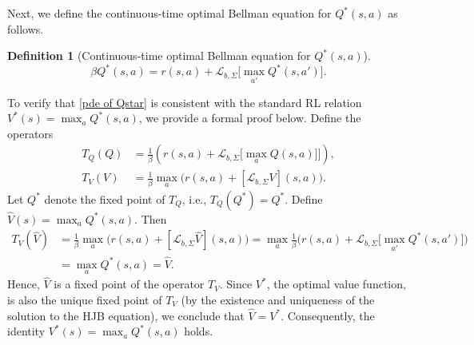 \documentclass[12pt]{article}
\newtheorem{definition}{Definition}
\def\mL{\mathcal{L}_{b,\Sigma}}
\def\l{\left}
\def\r{\right}
\begin{document}
Next, we define the continuous-time optimal Bellman equation for $Q^*(s,a)$ as follows.
\begin{definition}[Continuous-time optimal Bellman equation for $Q^*(s,a)$]\label{def of Q-pde}
\begin{equation}\label{pde of Qstar}
    \beta Q^*(s,a) = r(s,a) + \mL \big[\max_{a'} Q^*(s,a')\big] .
\end{equation}
\end{definition}

To verify that \eqref{pde of Qstar} is consistent with the standard RL relation $V^*(s) = \max_{a} Q^*(s,a)$, we provide a formal proof below.
Define the operators
\begin{align}\label{operator-Q}
T_Q(Q) &=\frac{1}{\beta}\l( r(s,a) + \mL \big[\max_{a} Q(s,a)\big] \big]\r),\\
T_V(V) &= \frac1\beta\max_{a} \Big(r(s,a) + [\mL V](s,a) \Big).
\end{align}
Let $Q^*$ denote the fixed point of $T_Q$, i.e., $T_Q(Q^*) = Q^*$. Define $\hat{V}(s) = \max_{a} Q^*(s,a)$. Then
\begin{align*}
    T_V(\hat{V}) 
    &= \frac{1}{\beta}\max_{a}\Big(r(s,a) + [\mL \hat{V}](s,a)\Big) = \max_{a}\frac1\beta\Big(r(s,a) + \mL \big[\max_{a'} Q^*(s,a')\big]\Big) \\
    &= \max_{a} Q^*(s,a) = \hat{V}.
\end{align*}
Hence, $\hat{V}$ is a fixed point of the operator $T_V$. Since $V^*$, the optimal value function, is also the unique fixed point of $T_V$ (by the existence and uniqueness of the solution to the HJB equation), we conclude that $\hat{V} = V^*$. Consequently, the identity $V^*(s) = \max_{a} Q^*(s,a)$ holds.
\end{document}
